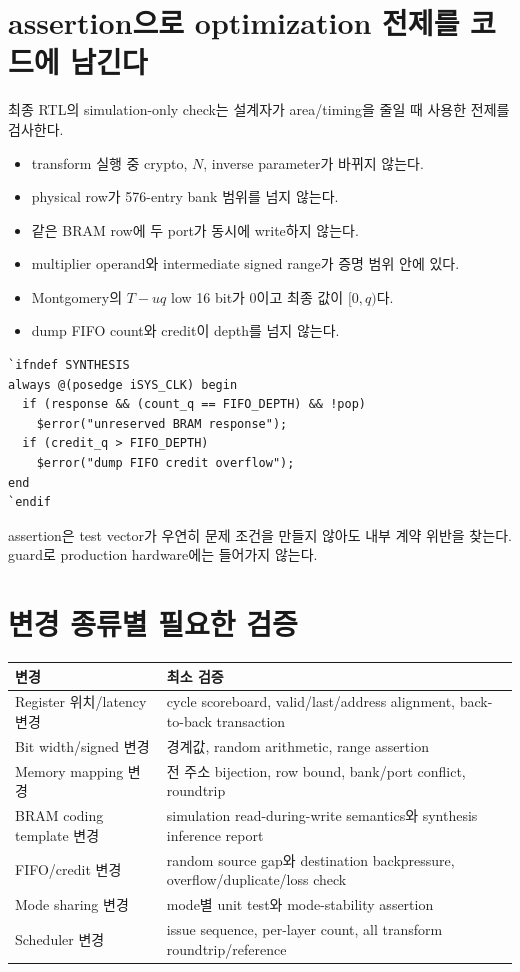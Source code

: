 \section{assertion으로 optimization 전제를 코드에 남긴다}

최종 RTL의 simulation-only check는 설계자가 area/timing을 줄일 때 사용한 전제를
검사한다.

\begin{itemize}
  \item transform 실행 중 crypto, $N$, inverse parameter가 바뀌지 않는다.
  \item physical row가 576-entry bank 범위를 넘지 않는다.
  \item 같은 BRAM row에 두 port가 동시에 write하지 않는다.
  \item multiplier operand와 intermediate signed range가 증명 범위 안에 있다.
  \item Montgomery의 $T-uq$ low 16 bit가 0이고 최종 값이 $[0,q)$다.
  \item dump FIFO count와 credit이 depth를 넘지 않는다.
\end{itemize}

\begin{lstlisting}
`ifndef SYNTHESIS
always @(posedge iSYS_CLK) begin
  if (response && (count_q == FIFO_DEPTH) && !pop)
    $error("unreserved BRAM response");
  if (credit_q > FIFO_DEPTH)
    $error("dump FIFO credit overflow");
end
`endif
\end{lstlisting}

assertion은 test vector가 우연히 문제 조건을 만들지 않아도 내부 계약 위반을
찾는다.  guard로 production hardware에는 들어가지 않는다.

\section{변경 종류별 필요한 검증}

\begin{longtable}{L{44mm}L{118mm}}
\toprule
변경 & 최소 검증 \\
\midrule
Register 위치/latency 변경 & cycle scoreboard, valid/last/address alignment, back-to-back transaction \\
Bit width/signed 변경 & 경계값, random arithmetic, range assertion \\
Memory mapping 변경 & 전 주소 bijection, row bound, bank/port conflict, roundtrip \\
BRAM coding template 변경 & simulation read-during-write semantics와 synthesis inference report \\
FIFO/credit 변경 & random source gap와 destination backpressure, overflow/duplicate/loss check \\
Mode sharing 변경 & mode별 unit test와 mode-stability assertion \\
Scheduler 변경 & issue sequence, per-layer count, all transform roundtrip/reference \\
\bottomrule
\end{longtable}

